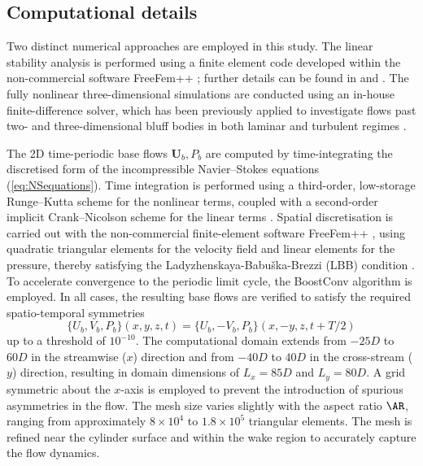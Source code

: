 \subsection{Computational details}

Two distinct numerical approaches are employed in this study. The linear stability analysis is performed using a finite element code developed within the non-commercial software FreeFem++ \citep{hecht-2012}; further details can be found in \citet{chiarini-quadrio-auteri-2022d} and \citet{chiarini-nastro-2025}. The fully nonlinear three-dimensional simulations are conducted using an in-house finite-difference solver, which has been previously applied to investigate flows past two- and three-dimensional bluff bodies in both laminar and turbulent regimes \citep{chiarini-quadrio-auteri-2022d,chiarini-boujo-2024,chiarini-etal-2022}.

The 2D time-periodic base flows ${\boldsymbol{U}_b, P_b}$ are computed by time-integrating the discretised form of the incompressible Navier–Stokes equations (\ref{eq:NSequations}). Time integration is performed using a third-order, low-storage Runge--Kutta scheme for the nonlinear terms, coupled with a second-order implicit Crank--Nicolson scheme for the linear terms \citep{rai-moin-1991}. Spatial discretisation is carried out with the non-commercial finite-element software FreeFem++ \citep{hecht-2012}, using quadratic triangular elements for the velocity field and linear elements for the pressure, thereby satisfying the Ladyzhenskaya-Babuška-Brezzi (LBB) condition \citep{brezzi-1974}.
%
To accelerate convergence to the periodic limit cycle, the BoostConv algorithm \citep{citro-etal-2017} is employed. In all cases, the resulting base flows are verified to satisfy the required spatio-temporal symmetries 
%
\begin{equation}
\{U_b,V_b,P_b\}(x,y,z,t) = \{U_b,-V_b,P_b\}(x,-y,z,t+T/2)
\end{equation}
%
up to a threshold of $10^{-10}$. The computational domain extends from $-25D$ to $60D$ in the streamwise ($x$) direction and from $-40D$ to $40D$ in the cross-stream ($y$) direction, resulting in domain dimensions of $L_x = 85D$ and $L_y = 80D$. A grid symmetric about the $x$-axis is employed to prevent the introduction of spurious asymmetries in the flow. The mesh size varies slightly with the aspect ratio $\AR$, ranging from approximately $8 \times 10^4$ to $1.8 \times 10^5$ triangular elements. The mesh is refined near the cylinder surface and within the wake region to accurately capture the flow dynamics.

